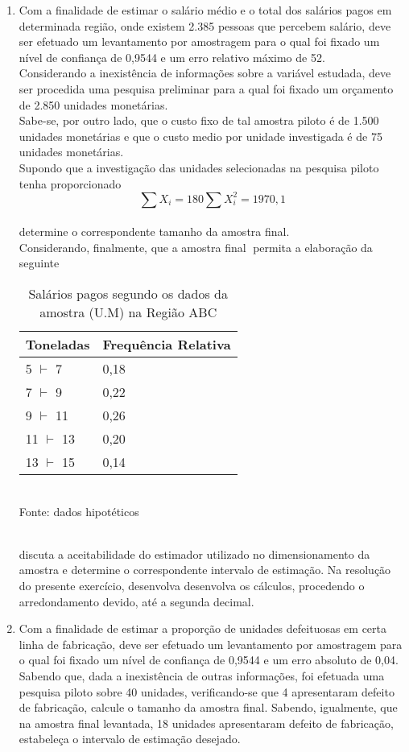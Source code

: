 \begin{enumerate}[resume]
\item Com a finalidade de estimar o salário médio e o total dos salários pagos em determinada região, onde existem 2.385 pessoas que percebem salário, deve ser efetuado um levantamento por amostragem para o qual foi fixado um nível de confiança de 0,9544 e um erro relativo máximo de 52.\\
Considerando a inexistência de informações sobre a variável estudada, deve ser procedida uma pesquisa preliminar para a qual foi fixado um orçamento de 2.850 unidades monetárias.\\
Sabe-se, por outro lado, que o custo fixo de tal amostra piloto é de 1.500 unidades monetárias e que o custo medio por unidade investigada é de 75 unidades monetárias.\\
Supondo que a investigação das unidades selecionadas na pesquisa piloto tenha proporcionado\\
$$\sum X_{i} = 180  \sum X_{i}^{2} = 1970,1$$\\
determine o correspondente tamanho da amostra final.\\
Considerando, finalmente, que a amostra final permita a elaboração da seguinte\\
	\begin{table}[!htb]
	\centering
	\caption{Salários pagos segundo os dados da amostra (U.M) na Região ABC}
	\vspace{0.5cm}
	\begin{tabular}{ll}
	Toneladas & Frequência Relativa \\
	\hline 
	5 $\vdash$ 7 & 0,18  \\
	7 $\vdash$ 9 & 0,22  \\
	9 $\vdash$ 11 & 0,26  \\
	11 $\vdash$ 13 & 0,20 \\
	13 $\vdash$ 15 & 0,14  \\
	\end{tabular}
	\\ Fonte: dados hipotéticos	
	\end{table}\\
discuta a aceitabilidade do estimador utilizado no dimensionamento da amostra e determine o correspondente intervalo de estimação. Na resolução do presente exercício, desenvolva desenvolva os cálculos, procedendo o arredondamento devido, até a segunda decimal.

\item Com a finalidade de estimar a proporção de unidades defeituosas em certa linha de fabricação, deve ser efetuado um levantamento por amostragem para o qual foi fixado um nível de confiança de 0,9544 e um erro absoluto de 0,04. Sabendo que, dada a inexistência de outras informações, foi efetuada uma pesquisa piloto sobre 40 unidades, verificando-se que 4 apresentaram defeito de fabricação, calcule o tamanho da amostra final. Sabendo, igualmente, que na amostra final levantada, 18 unidades apresentaram defeito de fabricação, estabeleça o intervalo de estimação desejado.


\end{enumerate}
